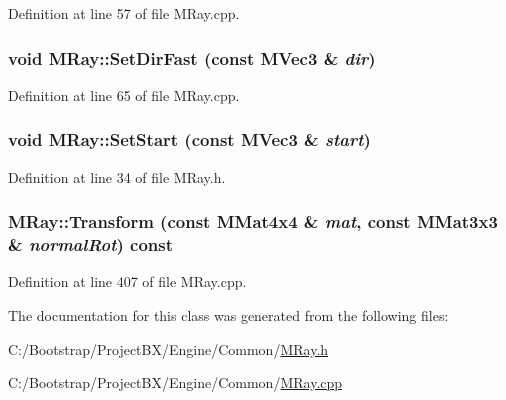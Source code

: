 Definition at line 57 of file MRay.cpp.\hypertarget{class_m_ray_5736afa27c05767f237c46842dece57f}{
\subsubsection[{SetDirFast}]{\setlength{\rightskip}{0pt plus 5cm}void MRay::SetDirFast (const {\bf MVec3} \& {\em dir})}}
\label{class_m_ray_5736afa27c05767f237c46842dece57f}




Definition at line 65 of file MRay.cpp.\hypertarget{class_m_ray_116cc00ec9c732cf178a57a8110b3efe}{
\subsubsection[{SetStart}]{\setlength{\rightskip}{0pt plus 5cm}void MRay::SetStart (const {\bf MVec3} \& {\em start})}}
\label{class_m_ray_116cc00ec9c732cf178a57a8110b3efe}




Definition at line 34 of file MRay.h.\hypertarget{class_m_ray_7cd16f0d5b6882ebc5cf2f381af6e02a}{
\subsubsection[{Transform}]{ MRay::Transform (const {\bf MMat4x4} \& {\em mat}, \/  const {\bf MMat3x3} \& {\em normalRot}) const}}
\label{class_m_ray_7cd16f0d5b6882ebc5cf2f381af6e02a}




Definition at line 407 of file MRay.cpp.

The documentation for this class was generated from the following files:\begin{CompactItemize}
\item 
C:/Bootstrap/ProjectBX/Engine/Common/\hyperlink{_m_ray_8h}{MRay.h}\item 
C:/Bootstrap/ProjectBX/Engine/Common/\hyperlink{_m_ray_8cpp}{MRay.cpp}\end{CompactItemize}
